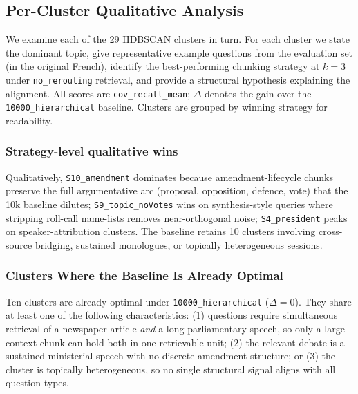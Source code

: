 
\subsection{Per-Cluster Qualitative Analysis}
\label{sec:qualitative}

We examine each of the 29 HDBSCAN clusters in turn.
For each cluster we state the dominant topic, give representative example questions
from the evaluation set (in the original French), identify the best-performing
chunking strategy at $k{=}3$ under \texttt{no\_rerouting} retrieval, and provide
a structural hypothesis explaining the alignment.
All scores are \texttt{cov\_recall\_mean}; $\Delta$ denotes the gain over the
\texttt{10000\_hierarchical} baseline.
Clusters are grouped by winning strategy for readability.

\subsubsection{Strategy-level qualitative wins}
\label{sec:strategy-wins}

Qualitatively, \texttt{S10\_amendment} dominates because amendment-lifecycle
chunks preserve the full argumentative arc (proposal, opposition, defence,
vote) that the 10k baseline dilutes; \texttt{S9\_topic\_noVotes} wins on
synthesis-style queries where stripping roll-call name-lists removes
near-orthogonal noise; \texttt{S4\_president} peaks on
speaker-attribution clusters. The baseline retains 10 clusters involving
cross-source bridging, sustained monologues, or topically heterogeneous
sessions.

\subsubsection{Clusters Where the Baseline Is Already Optimal}
\label{sec:baseline-clusters}

Ten clusters are already optimal under \texttt{10000\_hierarchical} ($\Delta = 0$).
They share at least one of the following characteristics: (1) questions require
simultaneous retrieval of a newspaper article \emph{and} a long parliamentary
speech, so only a large-context chunk can hold both in one retrievable unit; (2)
the relevant debate is a sustained ministerial speech with no discrete amendment
structure; or (3) the cluster is topically heterogeneous, so no single structural
signal aligns with all question types.

